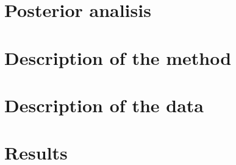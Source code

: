\documentclass[
]{article}
\begin{document}
\hypertarget{posterior-analisis}{%
\section{Posterior analisis}\label{posterior-analisis}}

\hypertarget{description-of-the-method}{%
\section{Description of the method}\label{description-of-the-method}}

\hypertarget{description-of-the-data}{%
\section{Description of the data}\label{description-of-the-data}}

\hypertarget{results}{%
\section{Results}\label{results}}

\renewcommand\refname{Discussion}
  
\end{document}
